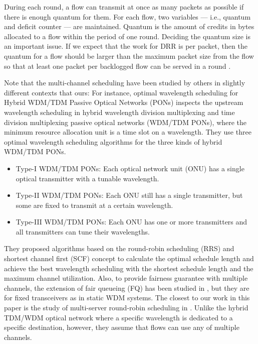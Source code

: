 \documentclass[conference,letterpaper]{IEEEtran}
\begin{document}
During each round, a flow can transmit at once as many packets as possible if
there is enough quantum for them. For each flow, two variables --- i.e., quantum
and deficit counter --- are maintained. Quantum is the amount of credits in
bytes allocated to a flow within the period of one round. Deciding the quantum
size is an important issue. If we expect that the work for DRR is  per
packet, then the quantum for a flow should be larger than the maximum packet
size from the flow so that at least one packet per backlogged flow can be served
in a round \cite{Shreedhar:95-1}.


Note that the multi-channel scheduling have been studied by others in slightly
different contexts that ours: For instance, optimal wavelength scheduling for
Hybrid WDM/TDM Passive Optical Networks (PONs)
\cite{wang11:_optim_wavel_sched_hybrid_wdm} inspects the upstream wavelength
scheduling in hybrid wavelength division multiplexing and time division
multiplexing passive optical networks (WDM/TDM PONs), where the minimum resource
allocation unit is a time slot on a wavelength. They use three optimal
wavelength scheduling algorithms for the three kinds of hybrid WDM/TDM PONs.
\begin{itemize}
\item Type-I WDM/TDM PONs: Each optical network unit (ONU) has a single optical
  transmitter with a tunable wavelength.
\item Type-II WDM/TDM PONs: Each ONU still has a single transmitter, but some
  are fixed to transmit at a certain wavelength.
\item Type-III WDM/TDM PONs: Each ONU has one or more transmitters and all
  transmitters can tune their wavelengths.
\end{itemize}
They proposed algorithms based on the round-robin scheduling (RRS) and shortest
channel first (SCF) concept to calculate the optimal schedule length and achieve
the best wavelength scheduling with the shortest schedule length and the maximum
channel utilization.
Also, to provide fairness guarantee with multiple channels, the extension of
fair queueing (FQ) has been studied in \cite{Blanquer:01-1,Cobb:02-1}, but they
are for fixed transceivers as in static WDM systems. The closest to our work in
this paper is the study of multi-server round-robin scheduling in
\cite{xiao04:_analy_of_multi_server_round}. Unlike the hybrid TDM/WDM optical
network where a specific wavelength is dedicated to a specific destination,
however, they assume that flows can use any of multiple channels.
\end{document}
